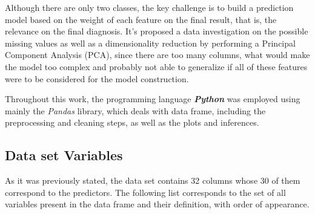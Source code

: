 \documentclass[conference]{IEEEtran}
\begin{document}
Although there are only two classes, the key challenge is to build a prediction
model based on the weight of each feature on the final result, that is, the relevance
on the final diagnosis. It's proposed a data investigation on the possible missing values as 
well as a dimensionality reduction by performing a Principal Component Analysis (PCA), 
since there are too many columns, what would make the model too complex and probably not able 
to generalize if all of these features were to be considered for the model construction. 

Throughout this work, the programming language \textit{\textbf{Python}} was employed 
using mainly the \textit{Pandas} library, which deals with data frame, including the 
preprocessing and cleaning steps, as well as the plots and inferences. 


\subsection{Data set Variables}

As it was previously stated, the data set contains 32 columns whose 30 of them 
correspond to the predictors. The following list corresponds to the set of all 
variables present in the data frame and their definition, with order of appearance. 
\end{document}
